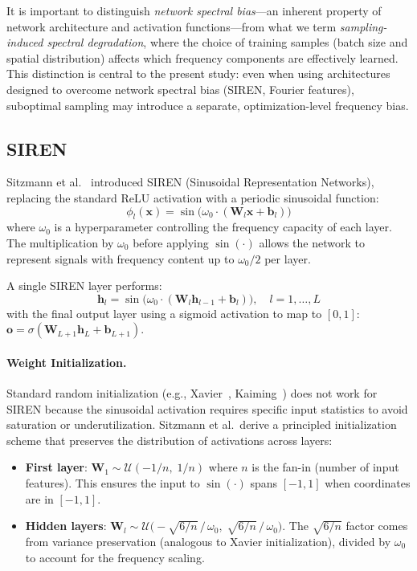 \documentclass[a4paper,oneside,11pt,english]{scrartcl}
\begin{document}
It is important to distinguish \emph{network spectral bias}---an inherent
property of network architecture and activation functions---from what we term
\emph{sampling-induced spectral degradation}, where the choice of training
samples (batch size and spatial distribution) affects which frequency
components are effectively learned.  This distinction is central to the
present study: even when using architectures designed to overcome network
spectral bias (SIREN, Fourier features), suboptimal sampling may introduce
a separate, optimization-level frequency bias.

\subsection{SIREN}
\label{sec:siren}

Sitzmann et al.~\cite{sitzmann2020siren} introduced SIREN (Sinusoidal
Representation Networks), replacing the standard ReLU activation with a
periodic sinusoidal function:
\begin{equation}
    \phi_l(\mathbf{x}) = \sin\bigl(\omega_0 \cdot (\mathbf{W}_l \mathbf{x}
    + \mathbf{b}_l)\bigr)
\end{equation}
where $\omega_0$ is a hyperparameter controlling the frequency capacity of
each layer.  The multiplication by $\omega_0$ before applying $\sin(\cdot)$
allows the network to represent signals with frequency content up to
$\omega_0 / 2$ per layer.

A single SIREN layer performs:
\begin{equation}
    \mathbf{h}_l = \sin\bigl(\omega_0 \cdot (\mathbf{W}_l \mathbf{h}_{l-1}
    + \mathbf{b}_l)\bigr), \quad l = 1, \ldots, L
\end{equation}
with the final output layer using a sigmoid activation to map to $[0, 1]$:
$\mathbf{o} = \sigma(\mathbf{W}_{L+1} \mathbf{h}_L + \mathbf{b}_{L+1})$.

\paragraph{Weight Initialization.}
Standard random initialization (e.g., Xavier~\cite{glorot2010xavier},
Kaiming~\cite{he2015delving}) does not work for SIREN because the
sinusoidal activation requires specific input statistics to avoid
saturation or underutilization.  Sitzmann et al.\ derive a
principled initialization scheme that preserves the distribution of
activations across layers:
\begin{itemize}
    \item \textbf{First layer}: $\mathbf{W}_1 \sim
          \mathcal{U}(-1/n, \; 1/n)$ where $n$ is the fan-in (number of input
          features).  This ensures the input to $\sin(\cdot)$ spans $[-1, 1]$
          when coordinates are in $[-1, 1]$.
    \item \textbf{Hidden layers}: $\mathbf{W}_l \sim
          \mathcal{U}\bigl(-\sqrt{6/n}\,/\,\omega_0,\;
          \sqrt{6/n}\,/\,\omega_0\bigr)$.  The $\sqrt{6/n}$ factor comes
          from variance preservation (analogous to Xavier initialization),
          divided by $\omega_0$ to account for the frequency scaling.
\end{itemize}
\end{document}
